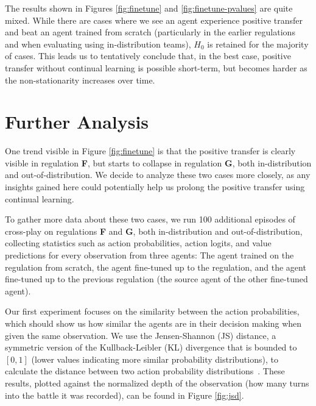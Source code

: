 The results shown in Figures \ref{fig:finetune} and \ref{fig:finetune-pvalues} are quite mixed.
While there are cases where we see an agent experience positive transfer and beat an agent trained from scratch (particularly in the earlier regulations and when evaluating using in-distribution teams), $H_0$ is retained for the majority of cases.
This leads us to tentatively conclude that, in the best case, positive transfer without continual learning is possible short-term, but becomes harder as the non-stationarity increases over time.

\section{Further Analysis} \label{sec:preliminary:analysis}
One trend visible in Figure \ref{fig:finetune} is that the positive transfer is clearly visible in regulation \textbf{F}, but starts to collapse in regulation \textbf{G}, both in-distribution and out-of-distribution.
We decide to analyze these two cases more closely, as any insights gained here could potentially help us prolong the positive transfer using continual learning.

To gather more data about these two cases, we run 100 additional episodes of cross-play on regulations \textbf{F} and \textbf{G}, both in-distribution and out-of-distribution, collecting statistics such as action probabilities, action logits, and value predictions for every observation from three agents: The agent trained on the regulation from scratch, the agent fine-tuned up to the regulation, and the agent fine-tuned up to the previous regulation (the source agent of the other fine-tuned agent).

Our first experiment focuses on the similarity between the action probabilities, which should show us how similar the agents are in their decision making when given the same observation.
We use the Jensen-Shannon (JS) distance, a symmetric version of the Kullback-Leibler (KL) divergence that is bounded to $[0,1]$ (lower values indicating more similar probability distributions), to calculate the distance between two action probability distributions~\cite{dagan1997jsdistance}.
These results, plotted against the normalized depth of the observation (how many turns into the battle it was recorded), can be found in Figure \ref{fig:jsd}.

